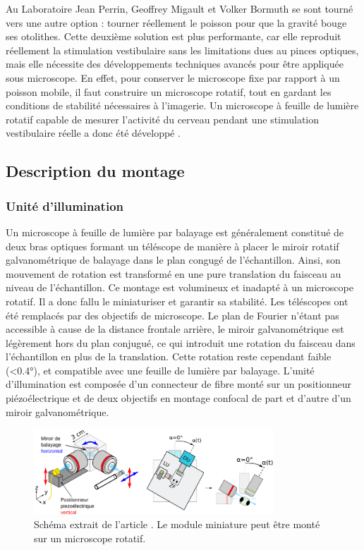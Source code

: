 Au Laboratoire Jean Perrin, Geoffrey Migault et Volker Bormuth se sont tourné vers une autre option : tourner réellement le poisson pour que la gravité bouge ses otolithes.
Cette deuxième solution est plus performante, car elle reproduit réellement la stimulation vestibulaire sans les limitations dues au pinces optiques, mais elle nécessite des développements techniques avancés pour être appliquée sous microscope. En effet, pour conserver le microscope fixe par rapport à un poisson mobile, il faut construire un microscope rotatif, tout en gardant les conditions de stabilité nécessaires à l'imagerie. Un microscope à feuille de lumière rotatif capable de mesurer l'activité du cerveau pendant une stimulation vestibulaire réelle a donc été développé \cite{migault_whole-brain_2018}.

\subsection{Description du montage}

\subsubsection{Unité d'illumination}

Un microscope à feuille de lumière par balayage est généralement constitué de deux bras optiques formant un téléscope de manière à placer le miroir rotatif galvanométrique de balayage dans le plan congugé de l'échantillon. Ainsi, son mouvement de rotation est transformé en une pure translation du faisceau au niveau de l'échantillon. Ce montage est volumineux et inadapté à un microscope rotatif. Il a donc fallu le miniaturiser et garantir sa stabilité. Les téléscopes ont été remplacés par des objectifs de microscope. Le plan de Fourier n'étant pas accessible à cause de la distance frontale arrière, le miroir galvanométrique est légèrement hors du plan conjugué, ce qui introduit une rotation du faisceau dans l'échantillon en plus de la translation. Cette rotation reste cependant faible (<0.4°), et compatible avec une feuille de lumière par balayage.  
L'unité d'illumination est composée d'un connecteur de fibre monté sur un positionneur piézoélectrique et de deux objectifs en montage confocal de part et d'autre d'un miroir galvanométrique. 

\begin{figure}
\centering
\includegraphics[width=0.8\textwidth]{./files/miniature_light-sheet.svg.png}
\caption{Schéma extrait de l'article \cite{migault_whole-brain_2018}. Le module miniature peut être monté sur un microscope rotatif.
}
\end{figure}

